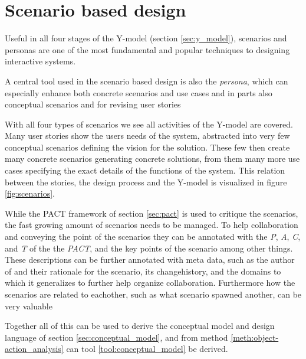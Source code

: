 \section{Scenario based design} \label{sec:scenario_based_design}
Useful in all four stages of the Y-model (section \ref{sec:y_model}), scenarios and personas are one of the most fundamental and popular techniques to designing interactive systems. \cite[p. 62]{benyon14}






A central tool used in the scenario based design is also the \emph{persona}, which can especially enhance both concrete scenarios and use cases and in parts also conceptual scenarios and for revising user stories



With all four types of scenarios we see all activities of the Y-model are covered. Many user stories show the users needs of the system, abstracted into very few conceptual scenarios defining the vision for the solution. These few then create many concrete scenarios generating concrete solutions, from them many more use cases specifying the exact details of the functions of the system. This relation between the stories, the design process and the Y-model is visualized in figure \ref{fig:scenarios}. \cite[p. 66, 196]{benyon14}





While the PACT framework of section \ref{sec:pact} is used to critique the scenarios, the fast growing amount of scenarios needs to be managed. To help collaboration and conveying the point of the scenarios they can be annotated with the \emph{P}, \emph{A}, \emph{C}, and \emph{T} of the the \emph{PACT}, and the key points of the scenario among other things. These descriptions can be further annotated with meta data, such as the author of and their rationale for the scenario, its changehistory, and the domains to which it generalizes to further help organize collaboration. Furthermore how the scenarios are related to eachother, such as what scenario spawned another, can be very valuable \cite[p. 70,72]{benyon14}






Together all of this can be used to derive the conceptual model and design language of section \ref{sec:conceptual_model}, and from method \ref{meth:object-action_analysis} can tool \ref{tool:conceptual_model} be derived. \cite[p. 67]{benyon14}
